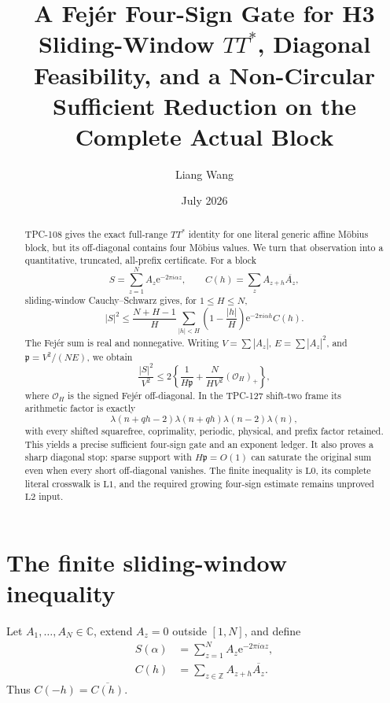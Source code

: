 \documentclass[11pt]{article}
\title{\textbf{A Fej\'er Four-Sign Gate for H3}\\
\large Sliding-Window \(TT^*\), Diagonal Feasibility, and a
Non-Circular Sufficient Reduction on the Complete Actual Block}
\author{Liang Wang}
\date{July 2026}
\theoremstyle{definition}
\theoremstyle{remark}
\newcommand{\e}{\mathrm e}
\newcommand{\Lzero}{\mathrm{L0}}
\newcommand{\Lone}{\mathrm{L1}}
\newcommand{\Ltwo}{\mathrm{L2}}
\begin{document}
\maketitle

\begin{abstract}
TPC-108 gives the exact full-range \(TT^*\) identity for one literal
generic affine M\"obius block, but its off-diagonal contains four
M\"obius values.  We turn that observation into a quantitative,
truncated, all-prefix certificate.  For a block
\[
 S=\sum_{z=1}^N A_z\e^{-2\pi i\alpha z},
\qquad
 C(h)=\sum_zA_{z+h}\overline{A_z},
\]
sliding-window Cauchy--Schwarz gives, for \(1\le H\le N\),
\[
 |S|^2\le
 \frac{N+H-1}{H}
 \sum_{|h|<H}
 \left(1-\frac{|h|}{H}\right)
 \e^{-2\pi i\alpha h}C(h).
\]
The Fej\'er sum is real and nonnegative.  Writing
\(V=\sum|A_z|\), \(E=\sum|A_z|^2\), and
\(\mathfrak p=V^2/(NE)\), we obtain
\[
 \frac{|S|^2}{V^2}
 \le
 2\left\{
 \frac1{H\mathfrak p}
 +
 \frac{N}{HV^2}(\mathcal O_H)_+
 \right\},
\]
where \(\mathcal O_H\) is the signed Fej\'er off-diagonal.  In the
TPC-127 shift-two frame its arithmetic factor is exactly
\[
 \lambda(n+qh-2)\lambda(n+qh)
 \lambda(n-2)\lambda(n),
\]
with every shifted squarefree, coprimality, periodic, physical, and
prefix factor retained.  This yields a precise sufficient
four-sign gate and an exponent ledger.  It also proves a sharp
diagonal stop: sparse support with \(H\mathfrak p=O(1)\) can saturate
the original sum even when every short off-diagonal vanishes.
The finite inequality is \(\Lzero\), its complete literal crosswalk
is \(\Lone\), and the required growing four-sign estimate remains
unproved \(\Ltwo\) input.
\end{abstract}

\section{The finite sliding-window inequality}

Let \(A_1,\ldots,A_N\in\mathbb C\), extend \(A_z=0\) outside
\([1,N]\), and define
\begin{align}
 S(\alpha)&=\sum_{z=1}^NA_z\e^{-2\pi i\alpha z},
\label{eq:S}\\
 C(h)&=\sum_{z\in\mathbb Z}A_{z+h}\overline{A_z}.
\label{eq:C}
\end{align}
Thus \(C(-h)=\overline{C(h)}\).
\end{document}
